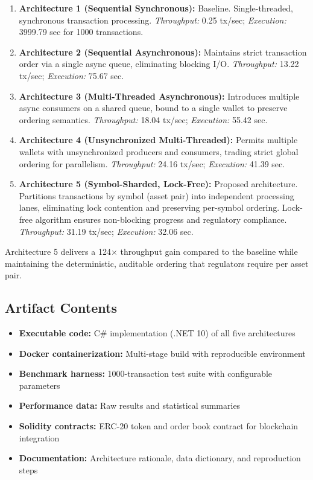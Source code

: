 \documentclass[conference]{IEEEtran}
\begin{document}
\begin{enumerate}
\item \textbf{Architecture 1 (Sequential Synchronous):} Baseline. Single-threaded, synchronous transaction processing. \textit{Throughput:} 0.25 tx/sec; \textit{Execution:} 3999.79 sec for 1000 transactions.
  
\item \textbf{Architecture 2 (Sequential Asynchronous):} Maintains strict transaction order via a single async queue, eliminating blocking I/O. \textit{Throughput:} 13.22 tx/sec; \textit{Execution:} 75.67 sec.

\item \textbf{Architecture 3 (Multi-Threaded Asynchronous):} Introduces multiple async consumers on a shared queue, bound to a single wallet to preserve ordering semantics. \textit{Throughput:} 18.04 tx/sec; \textit{Execution:} 55.42 sec.

\item \textbf{Architecture 4 (Unsynchronized Multi-Threaded):} Permits multiple wallets with unsynchronized producers and consumers, trading strict global ordering for parallelism. \textit{Throughput:} 24.16 tx/sec; \textit{Execution:} 41.39 sec.

\item \textbf{Architecture 5 (Symbol-Sharded, Lock-Free):} Proposed architecture. Partitions transactions by symbol (asset pair) into independent processing lanes, eliminating lock contention and preserving per-symbol ordering. Lock-free algorithm ensures non-blocking progress and regulatory compliance. \textit{Throughput:} 31.19 tx/sec; \textit{Execution:} 32.06 sec.
\end{enumerate}

Architecture 5 delivers a 124$\times$ throughput gain compared to the baseline while maintaining the deterministic, auditable ordering that regulators require per asset pair.

\subsection*{Artifact Contents}

\begin{itemize}
\item \textbf{Executable code:} C\# implementation (.NET 10) of all five architectures
\item \textbf{Docker containerization:} Multi-stage build with reproducible environment
\item \textbf{Benchmark harness:} 1000-transaction test suite with configurable parameters
\item \textbf{Performance data:} Raw results and statistical summaries
\item \textbf{Solidity contracts:} ERC-20 token and order book contract for blockchain integration
\item \textbf{Documentation:} Architecture rationale, data dictionary, and reproduction steps
\end{itemize}
\end{document}
